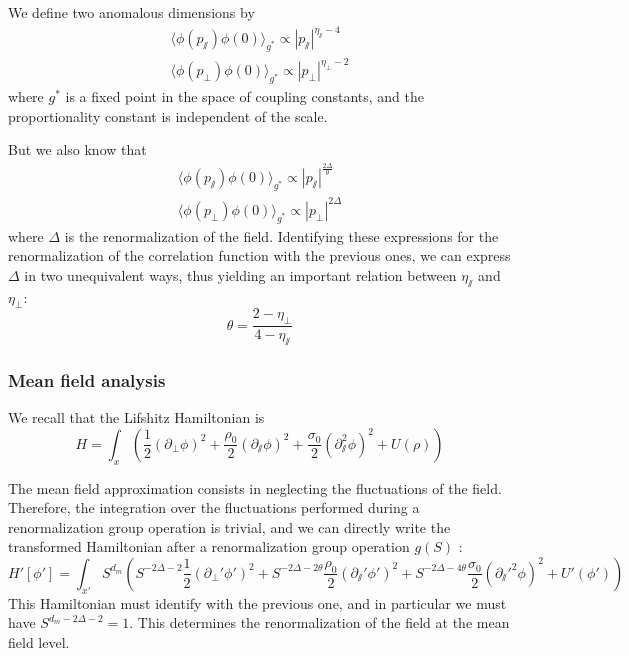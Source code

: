 We define two anomalous dimensions by
\begin{align}
\langle \phi(p_\sslash) \phi(0) \rangle_{g^*} \propto |p_\sslash|^{\eta_\sslash -4} \\
\langle \phi(p_\perp) \phi(0) \rangle_{g^*} \propto |p_\perp|^{\eta_\perp -2} 
\end{align}
where $g^*$ is a fixed point in the space of coupling constants, and the proportionality constant is independent of the scale.

But we also know that
\begin{align}
\langle \phi(p_\sslash) \phi(0) \rangle_{g^*} \propto |p_\sslash|^{\frac{2 \Delta}{\theta}} \\
\langle \phi(p_\perp) \phi(0) \rangle_{g^*} \propto |p_\perp|^{2\Delta} 
\end{align}
where $\Delta$ is the renormalization of the field. 
Identifying these expressions for the renormalization of the correlation function with the previous ones, we can express $\Delta$ in two unequivalent ways, thus yielding an important relation between $\eta_\sslash$ and $\eta_\perp$:
\begin{equation}
\theta = \frac{2- \eta_\perp}{4- \eta_\sslash}
\end{equation}

\subsubsection{Mean field analysis}

We recall that the Lifshitz Hamiltonian is
\begin{equation}
H = \int_x \left( \frac{1}{2}(\partial_\perp \phi)^2 + \frac{\rho_0}{2} (\partial_\sslash \phi)^2 + \frac{\sigma_0}{2} (\partial_\sslash^2 \phi)^2 + U(\rho) \right)
\end{equation}

The mean field approximation consists in neglecting the fluctuations of the field. Therefore, the integration over the fluctuations performed during a renormalization group operation is trivial, and we can directly write the transformed Hamiltonian after a renormalization group operation $g(S)$ :
\begin{equation}
H'[\phi'] = \int_{x'} S^{d_m} \left( S^{-2\Delta -2} \frac{1}{2}(\partial_\perp' \phi')^2 + S^{-2\Delta -2 \theta} \frac{\rho_0}{2}  (\partial_\sslash' \phi')^2 + S^{-2\Delta - 4 \theta} \frac{\sigma_0}{2}  (\partial_\sslash'^2 \phi)^2 + U'(\phi') \right)
\end{equation}
This Hamiltonian must identify with the previous one, and in particular we must have $S^{d_m-2\Delta -2} =1$. This determines  the renormalization of the field at the mean field level.

